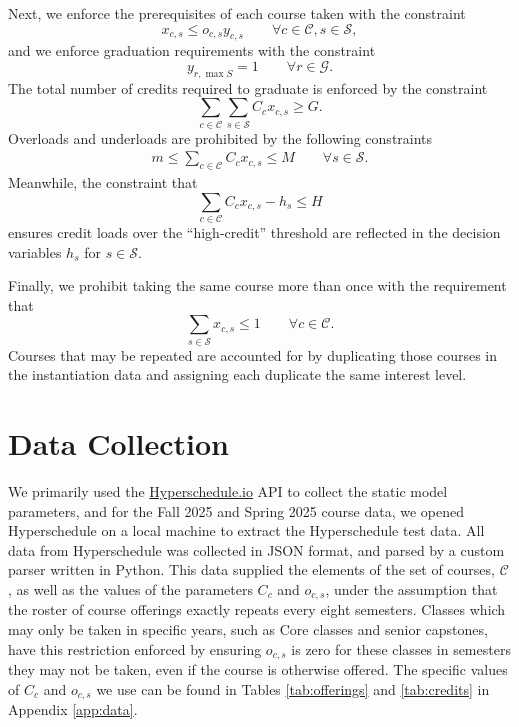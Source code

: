 \documentclass[12pt]{article}
\renewcommand{\S}{\mathcal{S}}
\renewcommand{\C}{\mathcal{C}}
\newcommand{\G}{\mathcal{G}}
\begin{document}
Next, we enforce the prerequisites of each course taken with the constraint
\begin{equation*}
    x_{c,s} \le o_{c,s} y_{c,s} \qquad\forall c\in\C, s\in\S,
\end{equation*}
and we enforce graduation requirements with the constraint
\begin{equation*}
    y_{r,\max S} = 1\qquad\forall r\in\G.
\end{equation*}
The total number of credits required to graduate is enforced by the constraint
\begin{equation*}
    \sum_{c\in\C} \sum_{s\in\S} C_c x_{c,s} \ge G.
\end{equation*}
Overloads and underloads are prohibited by the following constraints
\begin{gather*}
    m \le \sum_{c\in\C} C_c x_{c,s} \le M \qquad\forall s\in\S.
\end{gather*}
Meanwhile, the constraint that
\begin{equation*}
    \sum_{c\in\C} C_c x_{c,s} - h_s \le H
\end{equation*}
ensures credit loads over the ``high-credit'' threshold are reflected in the decision variables $h_s$ for $s\in\S$.

Finally, we prohibit taking the same course more than once with the requirement that
\begin{equation*}
    \sum_{s\in\S} x_{c,s} \le 1 \qquad\forall c\in\C.
\end{equation*}
Courses that may be repeated are accounted for by duplicating those courses in the instantiation data and assigning each duplicate the same interest level.

\section{Data Collection}\label{sec:data}

We primarily used the \href{https://hyperschedule.io}{Hyperschedule.io} API to collect the static model parameters, and for the Fall 2025 and Spring 2025 course data, we opened Hyperschedule on a local machine to extract the Hyperschedule test data.
All data from Hyperschedule was collected in JSON format, and parsed by a custom parser written in Python.
This data supplied the elements of the set of courses, $\C$, as well as the values of the parameters $C_c$ and $o_{c,s}$, under the assumption that the roster of course offerings exactly repeats every eight semesters.
Classes which may only be taken in specific years, such as Core classes and senior capstones, have this restriction enforced by ensuring $o_{c,s}$ is zero for these classes in semesters they may not be taken, even if the course is otherwise offered.
The specific values of $C_c$ and $o_{c,s}$ we use can be found in Tables \ref{tab:offerings} and \ref{tab:credits} in Appendix \ref{app:data}.
\end{document}
